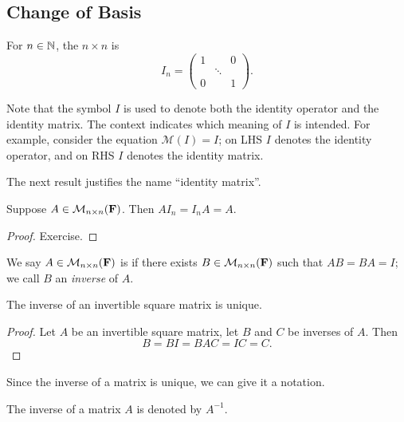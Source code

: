 \subsection{Change of Basis}
For $n\in\mathbb N$, the $n\times n$  is
\[I_n=\begin{pmatrix}
1&&0\\
&\ddots&\\
0&&1
\end{pmatrix}.\]

\begin{remark}
Note that the symbol $I$ is used to denote both the identity operator and the identity matrix. The context indicates which meaning of $I$ is intended. For example, consider the equation $\mathcal{M}(I)=I$; on LHS $I$ denotes the identity operator, and on RHS $I$ denotes the identity matrix.
\end{remark}

The next result justifies the name ``identity matrix''.

\begin{lemma}
Suppose $A\in\mathcal{M}_{n\times n}(\mathbf F)$. Then $AI_n=I_nA=A$.
\end{lemma}

\begin{proof}
Exercise.
\end{proof}

\begin{definition}
We say $A\in\mathcal{M}_{n\times n}(\mathbf F)$ is  if there exists $B\in\mathcal{M}_{n\times n}(\mathbf F)$ such that $AB=BA=I$; we call $B$ an \emph{inverse} of $A$.
\end{definition}

\begin{lemma}
The inverse of an invertible square matrix is unique.
\end{lemma}

\begin{proof}
Let $A$ be an invertible square matrix, let $B$ and $C$ be inverses of $A$. Then
\[B=BI=BAC=IC=C.\]
\end{proof}

Since the inverse of a matrix is unique, we can give it a notation.

\begin{notation}
The inverse of a matrix $A$ is denoted by $A^{-1}$.
\end{notation}

